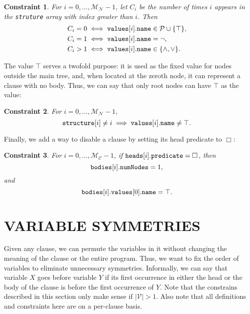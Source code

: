 \documentclass[letterpaper]{article}
\newtheorem{constraint}{Constraint}
\theoremstyle{definition}
\newcommand{\variable}[1]{\texttt{\textup{#1}}}
\newcommand{\predicates}{\mathcal{P}}
\newcommand{\variables}{\mathcal{V}}
\newcommand{\maxNumNodes}{\mathcal{M}_{\mathcal{N}}}
\newcommand{\maxNumClauses}{\mathcal{M}_{\mathcal{C}}}
\begin{document}
\begin{constraint} \label{constraint:node_types}
  For $i = 0, \dots, \maxNumNodes{} - 1$, let $C_i$ be the number of times $i$
  appears in the \variable{struture} array with index greater than $i$. Then
  \begin{align*}
    C_i = 0 &\iff \variable{values}[i].\variable{name} \in \predicates{} \cup \{ \top \},\\
    C_i = 1 &\iff \variable{values}[i].\variable{name} = \neg,\\
    C_i > 1 &\iff \variable{values}[i].\variable{name} \in \{ \land, \lor \}.
  \end{align*}
\end{constraint}

The value $\top$ serves a twofold purpose: it is used as the fixed value for
nodes outside the main tree, and, when located at the zeroth node, it can
represent a clause with no body. Thus, we can say that only root nodes can have
$\top$ as the value:

\begin{constraint}
  For $i = 0, \dots, \maxNumNodes{} - 1$,
  \[
    \variable{structure}[i] \ne i \implies
    \variable{values}[i].\variable{name} \ne \top.
  \]
\end{constraint}

Finally, we add a way to disable a clause by setting its head predicate to
$\Box$:

\begin{constraint}
  For $i = 0, \dots, \maxNumClauses{} - 1$, if
  $\variable{heads}[i].\variable{predicate} = \Box$, then
  \[
    \variable{bodies}[i].\variable{numNodes} = 1,
  \]
  and
  \[
    \variable{bodies}[i].\variable{values}[0].\variable{name} =
    \top.
  \]
\end{constraint}

\section{VARIABLE SYMMETRIES} \label{sec:variable_symmetry}

Given any clause, we can permute the variables in it without changing the
meaning of the clause or the entire program. Thus, we want to fix the order of
variables to eliminate unnecessary symmetries. Informally, we can say that
variable $X$ goes before variable $Y$ if its first occurrence in either the head
or the body of the clause is before the first occurrence of $Y$. Note that the
constrains described in this section only make sense if $|\variables| > 1$. Also
note that all definitions and constraints here are on a per-clause basis.
\end{document}
